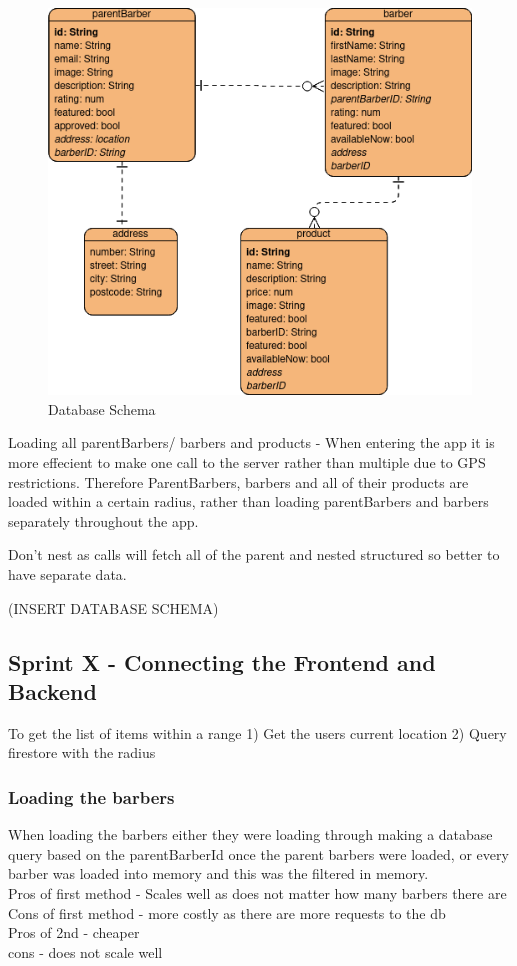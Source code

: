 \documentclass[12pt]{article}
\begin{document}
	\begin{figure}[H]
		\centering
		\includegraphics[scale=0.7]{images/database-schema.png}
		\caption{Database Schema}
		\label{fig:database-schema}
	\end{figure}
	
	Loading all parentBarbers/ barbers and products - 
	When entering the app it is more effecient to make one call to the server rather than multiple due to GPS restrictions. Therefore ParentBarbers, barbers and all of their products are loaded within a certain radius, rather than loading parentBarbers and barbers separately throughout the app. 
	
	Don't nest as calls will fetch all of the parent and nested structured so better to have separate data.
	
	(INSERT DATABASE SCHEMA)
	
	\subsection{Sprint X - Connecting the Frontend and Backend}
	To get the list of items within a range
	1) Get the users current location
	2) Query firestore with the radius
	
	\subsubsection{Loading the barbers}
	When loading the barbers either they were loading through making a database query based on the parentBarberId once the parent barbers were loaded, or every barber was loaded into memory and this was the filtered in memory.
	\\
	Pros of first method - Scales well as does not matter how many barbers there are
	\\
	Cons of first method - more costly as there are more requests to the db
	\\
	Pros of 2nd - cheaper
	\\
	cons - does not scale well
	
\end{document}

